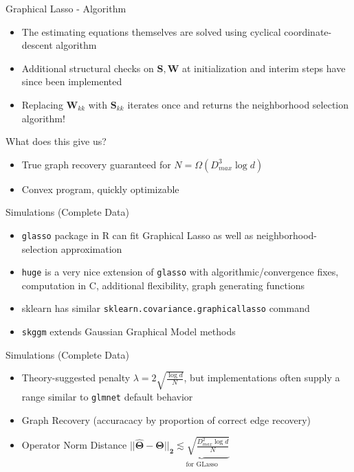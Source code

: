 \documentclass{beamer}
\begin{document}
\begin{frame}{Graphical Lasso - Algorithm}
\begin{itemize}
    \item The estimating equations themselves are solved using cyclical coordinate-descent algorithm 
    \item Additional structural checks on $\mathbf{S,W}$ at initialization and interim steps have since been implemented
    \item Replacing $\mathbf{W}_{kk}$ with $\mathbf{S}_{kk}$ iterates once and returns the neighborhood selection algorithm! 
\end{itemize}


What does this give us? 
\begin{itemize}
    \item True graph recovery guaranteed for $N=\Omega(D_{max}^3 \log d)$
    \item Convex program, quickly optimizable 
\end{itemize}

\end{frame}

\begin{frame}{Simulations (Complete Data)}
    \begin{itemize}
        \item \texttt{glasso} package in R can fit Graphical Lasso as well as neighborhood-selection approximation 
        \item \texttt{huge} is a very nice extension of \texttt{glasso} with algorithmic/convergence fixes, computation in C, additional flexibility, graph generating functions 
        \item sklearn has similar \texttt{sklearn.covariance.graphicallasso} command 
        \item \texttt{skggm} extends Gaussian Graphical Model methods  %
    \end{itemize}
\end{frame}

\begin{frame}{Simulations (Complete Data)}
    \begin{itemize}\setlength\itemsep{6mm}
        \item Theory-suggested penalty $\lambda = 2\sqrt{\frac{\log d}{N}}$, but implementations often supply a range similar to \texttt{glmnet} default behavior
        \item Graph Recovery (accuracacy by proportion of correct edge recovery)
        \item Operator Norm Distance $\mathbf{||\hat\Theta - \Theta||_2} \underbrace{\lesssim \sqrt{\frac{D_{max}^2\log d}{N}}}_{\text{for GLasso}}$ 
    \end{itemize}
\end{frame}
\end{document}

